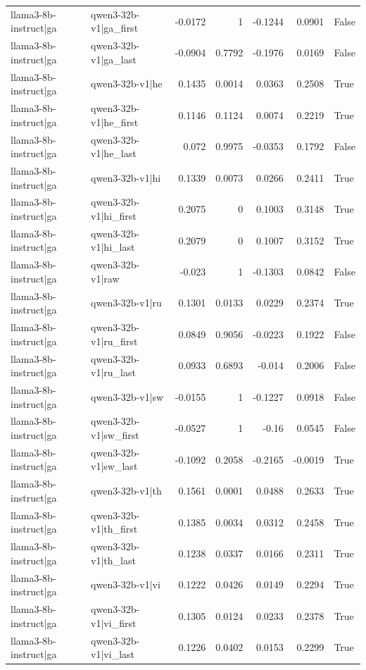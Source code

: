\begin{table}
\begin{tabular}{l l r r r r l}
llama3-8b-instruct|ga & qwen3-32b-v1|ga_first & -0.0172 & 1 & -0.1244 & 0.0901 & False \\
llama3-8b-instruct|ga & qwen3-32b-v1|ga_last & -0.0904 & 0.7792 & -0.1976 & 0.0169 & False \\
llama3-8b-instruct|ga & qwen3-32b-v1|he & 0.1435 & 0.0014 & 0.0363 & 0.2508 & True \\
llama3-8b-instruct|ga & qwen3-32b-v1|he_first & 0.1146 & 0.1124 & 0.0074 & 0.2219 & True \\
llama3-8b-instruct|ga & qwen3-32b-v1|he_last & 0.072 & 0.9975 & -0.0353 & 0.1792 & False \\
llama3-8b-instruct|ga & qwen3-32b-v1|hi & 0.1339 & 0.0073 & 0.0266 & 0.2411 & True \\
llama3-8b-instruct|ga & qwen3-32b-v1|hi_first & 0.2075 & 0 & 0.1003 & 0.3148 & True \\
llama3-8b-instruct|ga & qwen3-32b-v1|hi_last & 0.2079 & 0 & 0.1007 & 0.3152 & True \\
llama3-8b-instruct|ga & qwen3-32b-v1|raw & -0.023 & 1 & -0.1303 & 0.0842 & False \\
llama3-8b-instruct|ga & qwen3-32b-v1|ru & 0.1301 & 0.0133 & 0.0229 & 0.2374 & True \\
llama3-8b-instruct|ga & qwen3-32b-v1|ru_first & 0.0849 & 0.9056 & -0.0223 & 0.1922 & False \\
llama3-8b-instruct|ga & qwen3-32b-v1|ru_last & 0.0933 & 0.6893 & -0.014 & 0.2006 & False \\
llama3-8b-instruct|ga & qwen3-32b-v1|sw & -0.0155 & 1 & -0.1227 & 0.0918 & False \\
llama3-8b-instruct|ga & qwen3-32b-v1|sw_first & -0.0527 & 1 & -0.16 & 0.0545 & False \\
llama3-8b-instruct|ga & qwen3-32b-v1|sw_last & -0.1092 & 0.2058 & -0.2165 & -0.0019 & True \\
llama3-8b-instruct|ga & qwen3-32b-v1|th & 0.1561 & 0.0001 & 0.0488 & 0.2633 & True \\
llama3-8b-instruct|ga & qwen3-32b-v1|th_first & 0.1385 & 0.0034 & 0.0312 & 0.2458 & True \\
llama3-8b-instruct|ga & qwen3-32b-v1|th_last & 0.1238 & 0.0337 & 0.0166 & 0.2311 & True \\
llama3-8b-instruct|ga & qwen3-32b-v1|vi & 0.1222 & 0.0426 & 0.0149 & 0.2294 & True \\
llama3-8b-instruct|ga & qwen3-32b-v1|vi_first & 0.1305 & 0.0124 & 0.0233 & 0.2378 & True \\
llama3-8b-instruct|ga & qwen3-32b-v1|vi_last & 0.1226 & 0.0402 & 0.0153 & 0.2299 & True \\

\end{tabular}
\end{table}

